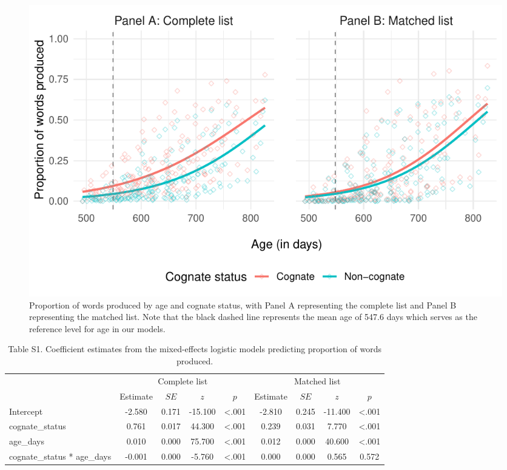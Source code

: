 \documentclass[
  ,man,floatsintext]{apa6}
\begin{document}
\begin{figure}

{\centering \includegraphics[width=1.2\linewidth]{CogVocab_supplemental_files/figure-latex/FigS1-1} 

}

\caption{Proportion of words produced by age and cognate status, with Panel A representing the complete list and Panel B representing the matched list. Note that the black dashed line represents the mean age of 547.6 days which serves as the reference level for age in our models.}\label{fig:FigS1}
\end{figure}

\begin{table}[tbp]

\begin{center}
\begin{threeparttable}

\caption{\label{tab:Table S1}Table S1. Coefficient estimates from the mixed-effects logistic models predicting proportion of words produced.}

\begin{tabular}{lcccccccc}
\toprule
 & \multicolumn{4}{c}{Complete list} & \multicolumn{4}{c}{Matched list} \\
\cmidrule(r){2-5} \cmidrule(r){6-9}
 & Estimate & $SE$ & $z$ & $p$ & Estimate & $SE$ & $z$ & $p$\\
\midrule
Intercept & -2.580 & 0.171 & -15.100 & <.001 & -2.810 & 0.245 & -11.400 & <.001\\
cognate\_status & 0.761 & 0.017 & 44.300 & <.001 & 0.239 & 0.031 & 7.770 & <.001\\
age\_days & 0.010 & 0.000 & 75.700 & <.001 & 0.012 & 0.000 & 40.600 & <.001\\
cognate\_status * age\_days & -0.001 & 0.000 & -5.760 & <.001 & 0.000 & 0.000 & 0.565 & 0.572\\
\bottomrule
\end{tabular}

\end{threeparttable}
\end{center}

\end{table}
\end{document}
